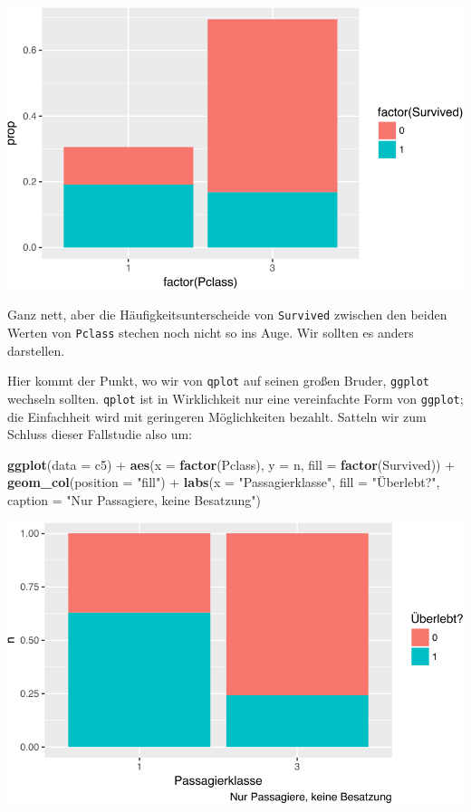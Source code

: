 \documentclass[12pt,ngerman,]{book}
\newenvironment{Shaded}{\begin{snugshade}}{\end{snugshade}}
\newcommand{\KeywordTok}[1]{\textcolor[rgb]{0.13,0.29,0.53}{\textbf{{#1}}}}
\newcommand{\DataTypeTok}[1]{\textcolor[rgb]{0.13,0.29,0.53}{{#1}}}
\newcommand{\StringTok}[1]{\textcolor[rgb]{0.31,0.60,0.02}{{#1}}}
\newcommand{\NormalTok}[1]{{#1}}
\renewenvironment{Shaded}{\begin{kframe}}{\end{kframe}}
\begin{document}
\begin{center}\includegraphics[width=0.7\linewidth]{075_Fallstudie_Titanic_files/figure-latex/unnamed-chunk-12-1} \end{center}

Ganz nett, aber die Häufigkeitsunterscheide von \texttt{Survived}
zwischen den beiden Werten von \texttt{Pclass} stechen noch nicht so ins
Auge. Wir sollten es anders darstellen.

Hier kommt der Punkt, wo wir von \texttt{qplot} auf seinen großen
Bruder, \texttt{ggplot} wechseln sollten. \texttt{qplot} ist in
Wirklichkeit nur eine vereinfachte Form von \texttt{ggplot}; die
Einfachheit wird mit geringeren Möglichkeiten bezahlt. Satteln wir zum
Schluss dieser Fallstudie also um:

\begin{Shaded}
\begin{Highlighting}[]
\KeywordTok{ggplot}\NormalTok{(}\DataTypeTok{data =} \NormalTok{c5) +}
\StringTok{  }\KeywordTok{aes}\NormalTok{(}\DataTypeTok{x =} \KeywordTok{factor}\NormalTok{(Pclass), }\DataTypeTok{y =} \NormalTok{n, }\DataTypeTok{fill =} \KeywordTok{factor}\NormalTok{(Survived)) +}\StringTok{ }
\StringTok{  }\KeywordTok{geom_col}\NormalTok{(}\DataTypeTok{position =} \StringTok{"fill"}\NormalTok{) +}
\StringTok{  }\KeywordTok{labs}\NormalTok{(}\DataTypeTok{x =} \StringTok{"Passagierklasse"}\NormalTok{, }\DataTypeTok{fill =} \StringTok{"Überlebt?"}\NormalTok{, }\DataTypeTok{caption =} \StringTok{"Nur Passagiere, keine Besatzung"}\NormalTok{)}
\end{Highlighting}
\end{Shaded}

\begin{center}\includegraphics[width=0.7\linewidth]{075_Fallstudie_Titanic_files/figure-latex/unnamed-chunk-13-1} \end{center}
\end{document}
